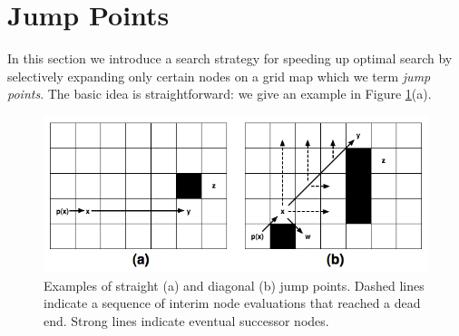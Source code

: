 \section{Jump Points}
In this section we introduce a search strategy for speeding up
optimal search by selectively expanding only certain nodes on a grid map
which we term \emph{jump points}.
The basic idea is straightforward: we give an example in Figure 
\ref{fig:jumppoints}(a).

\begin{figure}[tb]
       \begin{center}
		   \includegraphics[scale=0.35, trim = 10mm 10mm 10mm 0mm]
			{diagrams/jumppoints.png}
       \end{center}
	\vspace{-3pt}
       \caption{Examples of straight (a) and diagonal (b) jump points.
Dashed lines indicate a sequence of interim node evaluations that reached
a dead end. Strong lines indicate eventual successor nodes.}
       \label{fig:jumppoints}
\end{figure}

